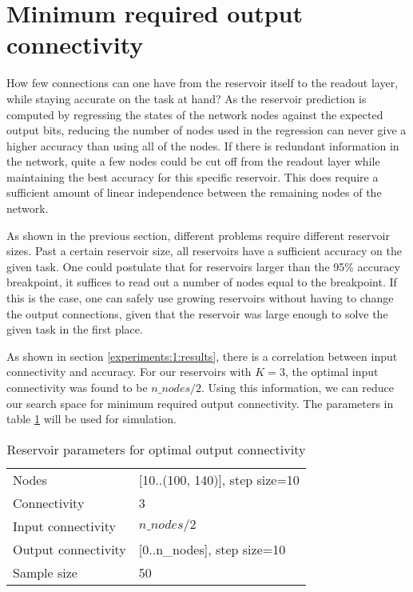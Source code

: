 \section{Minimum required output connectivity}

How few connections can one have from the reservoir itself to the readout layer,
while staying accurate on the task at hand?
As the reservoir prediction is computed by regressing the states of the network nodes against the expected output bits,
reducing the number of nodes used in the regression can never give a higher accuracy than using all of the nodes.
If there is redundant information in the network, quite a few nodes could be cut off from the readout layer while maintaining the best accuracy for this specific reservoir.
This does require a sufficient amount of linear independence between the remaining nodes of the network.

As shown in the previous section, different problems require different reservoir sizes.
Past a certain reservoir size, all reservoirs have a sufficient accuracy on the given task.
One could postulate that for reservoirs larger than the 95\% accuracy breakpoint,
it suffices to read out a number of nodes equal to the breakpoint.
If this is the case, one can safely use growing reservoirs without having to change the output connections,
given that the reservoir was large enough to solve the given task in the first place.

As shown in section \ref{experiments:1:results}, there is a correlation between input connectivity and accuracy.
For our reservoirs with $K=3$, the optimal input connectivity was found to be $n\_nodes/2$.
Using this information, we can reduce our search space for minimum required output connectivity.
The parameters in table \ref{tab:oc-reservoir-parameters} will be used for simulation.

\begin{table}[ht]
    \centering
    \caption{Reservoir parameters for optimal output connectivity}
    \label{tab:oc-reservoir-parameters}
    \begin{tabular}{ll}
        Nodes               & [10..(100, 140)], step size=10 \\
        Connectivity        & 3                              \\
        Input connectivity  & $ n\_nodes / 2 $               \\
        Output connectivity & [0..n\_nodes], step size=10    \\
        Sample size         & 50
    \end{tabular}
\end{table}

